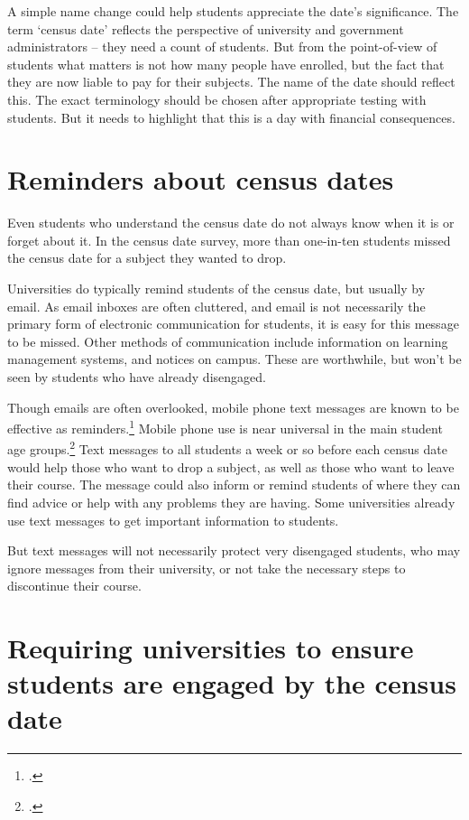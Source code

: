 A simple name change could help students appreciate the date's significance. The term `census date' reflects the perspective of university and government administrators -- they need a count of students. But from the point-of-view of students what matters is not how many people have enrolled, but the fact that they are now liable to pay for their subjects. The name of the date should reflect this. The exact terminology should be chosen after appropriate testing with students. But it needs to highlight that this is a day with financial consequences.

\section{Reminders about census dates}\label{sec:8.1}

Even students who understand the census date do not always know when it is or forget about it. In the census date survey, more than one-in-ten students missed the census date for a subject they wanted to drop.

Universities do typically remind students of the census date, but usually by email. As email inboxes are often cluttered, and email is not necessarily the primary form of electronic communication for students, it is easy for this message to be missed. Other methods of communication include information on learning management systems, and notices on campus. These are worthwhile, but won't be seen by students who have already disengaged.

Though emails are often overlooked, mobile phone text messages are known to be effective as reminders.\footcite{McLean2016} 
Mobile phone use is near universal in the main student age groups.\footcite{Deloitte2017} 
Text messages to all students a week or so before each census date would help those who want to drop a subject, as well as those who want to leave their course. The message could also inform or remind students of where they can find advice or help with any problems they are having. Some universities already use text messages to get important information to students.

But text messages will not necessarily protect very disengaged students, who may ignore messages from their university, or not take the necessary steps to discontinue their course.

\section{Requiring universities to ensure students are engaged by the census date }\label{sec:8.2}

